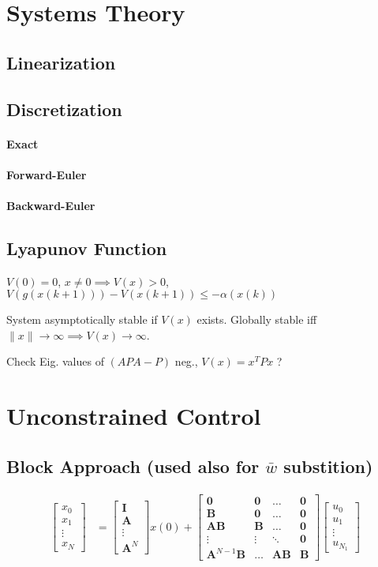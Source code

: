 \documentclass[landscape,a4paper,8pt]{scrartcl}
\newcommand\vA{\bm{A}}
\newcommand\vB{\bm{B}}
\newcommand\vI{\bm{I}}
\newcommand{\Me}[1]{\begin{bmatrix}#1\end{bmatrix}} %
\begin{document}

\begin{multicols*}{3}
\section{Systems Theory}
\subsection{Linearization}
\subsection{Discretization}
\paragraph{Exact}
\paragraph{Forward-Euler}
\paragraph{Backward-Euler}
\subsection{Lyapunov Function}
$V(0) = 0$, $x \neq 0 \implies V(x) > 0$, $V(g(x(k+1))) - V(x(k+1)) \leq - \alpha(x(k))$

System asymptotically stable if $V(x)$ exists.
Globally stable iff $\lVert x \rVert \rightarrow \infty \implies V(x) \rightarrow \infty$.

Check Eig. values of $(APA-P)$ neg., $V(x) = x^TPx$ ?

\section{Unconstrained Control}
\subsection{Block Approach (used also for $\bar w$ substition)}
\begin{align*}
		\Me{x_0 \\ x_1 \\ \vdots \\ x_N } & = \Me{\vI \\ \vA \\ \vdots \\ \vA^N}x(0) + \Me{\bm 0 & \bm 0 & \dots & \bm 0 \\ \vB & \bm 0 & \dots & \bm 0 \\ \vA\vB & \vB & \dots & \bm 0 \\ \vdots & \vdots & \ddots & \bm 0 \\ \vA^{N-1}\vB & \dots & \vA\vB & \vB}\Me{u_0 \\ u_1 \\ \vdots \\ u_{N_1}}
\end{align*}


\end{multicols*}
\end{document}
